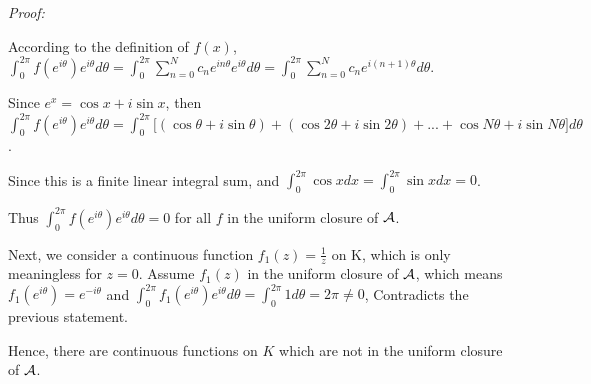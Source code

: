 \documentclass[hidelinks]{article}
\begin{document}
\begin{enumerate}
\textit{Proof:} 

According to the definition of $f(x)$, $\int_0^{2\pi} f(e^{i\theta}) e^{i\theta} d\theta = \int_0^{2\pi} \sum_{n=0}^N c_n e^{in\theta} e^{i\theta} d\theta =\int_0^{2\pi} \sum_{n=0}^N c_n  e^{i(n+1)\theta} d\theta $. 

Since $e^x=\cos x+i\sin x$, then $\int_0^{2\pi} f(e^{i\theta}) e^{i\theta} d\theta = \int_0^{2\pi} \Bigg[(\cos \theta +i\sin \theta)+(\cos 2\theta +i\sin 2\theta)+...+\cos N\theta +i\sin N\theta\bigg] d\theta$. 

Since this is a finite linear integral sum, and $\int_0^{2\pi} \cos xdx=\int_0^{2\pi} \sin xdx=0$.

Thus $\int_0^{2\pi} f(e^{i\theta}) e^{i\theta} d\theta = 0$ for all $f$ in
the uniform closure of ${\cal A}$.

Next, we consider a continuous function $f_1(z)=\frac{1}{z}$ on K, which is only meaningless for $z=0$.
Assume $f_1(z)$ in the uniform closure of ${\cal A}$, which means $f_1(e^{i\theta})=e^{-i\theta}$ and $\int_0^{2\pi} f_1(e^{i\theta})e^{i\theta}d\theta=\int_0^{2\pi} 1d\theta=2\pi\neq0$, Contradicts the previous statement.

Hence, there are continuous functions on $K$ which are not in the uniform closure
of ${\cal A}$.


\end{enumerate}
\end{document}
